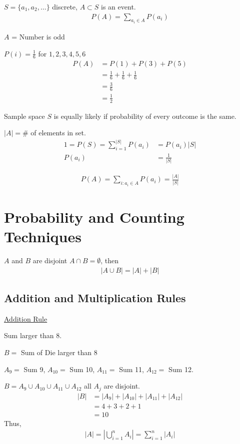 \documentclass{article}
\begin{document}
$S = \{a_1,a_2,\ldots\}$ discrete, $A \subset S$ is an event. 
\begin{align*}
    P(A) = \sum_{a_i \in A}P(a_i)
\end{align*}

$A$ = Number is odd

$P(i) = \frac{1}{6}$ for $1,2,3,4,5,6$
\begin{align*}
    P(A) &= P(1) + P(3) + P(5) \\
    &= \frac{1}{6} + \frac{1}{6} + \frac{1}{6} \\
    &= \frac{3}{6} \\
    &= \frac{1}{2}
\end{align*}

Sample space $S$ is equally likely if probability of every outcome is the same. 

$|A| = \#$ of elements in set. 
\begin{align*}
    1 = P(S) = \sum_{i=1}^{|S|}P(a_i) &= P(a_i)|S| \\
    P(a_i)&=\frac{1}{|S|}
\end{align*}

\begin{align*}
    P(A) = \sum_{i: a_i \in A} P(a_i) = \frac{|A|}{|S|}
\end{align*}

\section{Probability and Counting Techniques}

$A$ and $B$ are disjoint $A \cap B = \emptyset$, then 
\begin{align*}
    |A \cup B| = |A| + |B|
\end{align*}

\subsection{Addition and Multiplication Rules}

\underline{Addition Rule}

Sum larger than 8.

$B = $ Sum of Die larger than 8

$A_9 = $ Sum 9, $A_{10}= $ Sum 10, $A_{11} = $ Sum 11, $A_{12} = $ Sum 12.

$B = A_{9} \cup A_{10} \cup A_{11} \cup A_{12}$ all $A_j$ are disjoint.
\begin{align*}
    |B| &= |A_9| + |A_{10}| + |A_{11}| + |A_{12}| \\
    &= 4 + 3 + 2 + 1 \\
    & = 10
\end{align*}
Thus,
\begin{align*}
    |A| = |\bigcup_{i=1}^{n}A_i| = \sum_{i=1}^n|A_i|
\end{align*}
\end{document}

